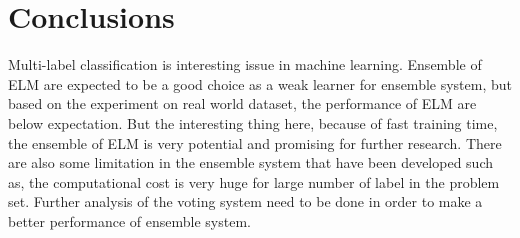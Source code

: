 \documentclass{article}
\begin{document}



\section{Conclusions}
\label{conculsion}


Multi-label classification is interesting issue in machine learning. Ensemble of ELM are expected to be a good choice as a weak learner for ensemble system, but based on the experiment on real world dataset, the performance of ELM are below expectation. But the interesting thing here, because of fast training time, the ensemble of ELM is very potential and promising for further research. There are also some limitation in the ensemble system that have been developed such as, the computational cost is very huge for large number of label in the problem set. Further analysis of the voting system need to be done in order to make a better performance of ensemble system. 




\end{document}
